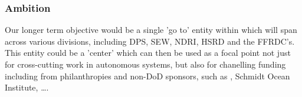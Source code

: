 \documentclass[10pt,letterpaper]{article}
\begin{document}
\subsubsection{Ambition}

Our longer term objective would be a single 'go to' entity within \org
which will span across various divisions, including DPS, SEW, NDRI,
HSRD and the FFRDC's. This entity could be a 'center' which can then
be used as a focal point not just for cross-cutting work in autonomous
systems, but also for chanelling funding including from philanthropies
and non-DoD sponsors, such as \noae, Schmidt Ocean Institute, \ldots.
\end{document}

